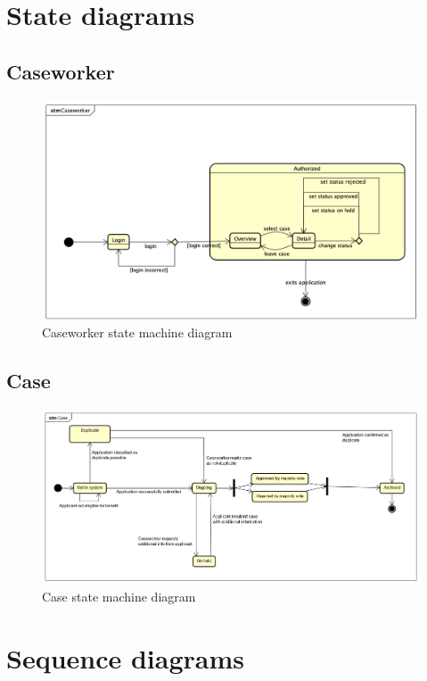 \newpage
\section{State diagrams}
\subsection{Caseworker}
\begin{figure}[htb!]
    \centering
    \includegraphics[width=\textwidth]{img/stm-caseworker.png}
    \caption{Caseworker state machine diagram}
\end{figure}

\subsection{Case}
\begin{figure}[htb!]
    \centering
    \includegraphics[width=\textwidth]{img/stm-case.png}
    \caption{Case state machine diagram}
\end{figure}

\newpage
\section{Sequence diagrams}
